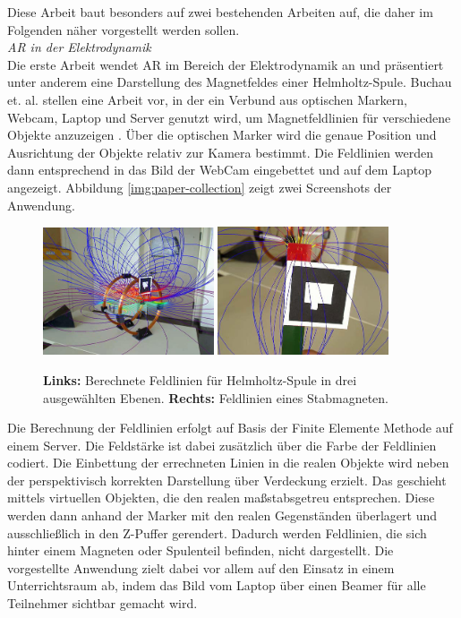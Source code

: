 Diese Arbeit baut besonders auf zwei bestehenden Arbeiten auf, die daher im Folgenden näher vorgestellt werden sollen.\\

\vspace{4px}
\textit{AR in der Elektrodynamik}\\
Die erste Arbeit wendet AR im Bereich der Elektrodynamik an und präsentiert unter anderem eine Darstellung des Magnetfeldes einer Helmholtz-Spule. Buchau et. al. stellen eine Arbeit vor, in der ein Verbund aus optischen Markern, Webcam, Laptop und Server genutzt wird, um Magnetfeldlinien für verschiedene Objekte anzuzeigen \cite{Buchau09}. Über die optischen Marker wird die genaue Position und Ausrichtung der Objekte relativ zur Kamera bestimmt. Die Feldlinien werden dann entsprechend in das Bild der WebCam eingebettet und auf dem Laptop angezeigt. Abbildung \ref{img:paper-collection} zeigt zwei Screenshots der Anwendung.\\

\begin{figure}[h!]
	\centering
	\includegraphics[width=0.45\textwidth]{images/Buchau09.jpg}
	\hspace{0.05cm}
	\includegraphics[width=0.45\textwidth]{images/Buchau09_Magnet_2.jpg}
	\caption{\textbf{Links:} Berechnete Feldlinien für Helmholtz-Spule in drei ausgewählten Ebenen. \textbf{Rechts: } Feldlinien eines Stabmagneten.\cite{Buchau09}}
\end{figure}

Die Berechnung der Feldlinien erfolgt auf Basis der Finite Elemente Methode auf einem Server. Die Feldstärke ist dabei zusätzlich über die Farbe der Feldlinien codiert. Die Einbettung der errechneten Linien in die realen Objekte wird neben der perspektivisch korrekten Darstellung über Verdeckung erzielt. Das geschieht mittels  virtuellen Objekten, die den realen maßstabsgetreu entsprechen. Diese werden dann anhand der Marker mit den realen Gegenständen überlagert und ausschließlich in den Z-Puffer gerendert. Dadurch werden Feldlinien, die sich hinter einem Magneten oder Spulenteil befinden, nicht dargestellt. Die vorgestellte Anwendung zielt dabei vor allem auf den Einsatz in einem Unterrichtsraum ab, indem das Bild vom Laptop über einen Beamer für alle Teilnehmer sichtbar gemacht wird.\\

